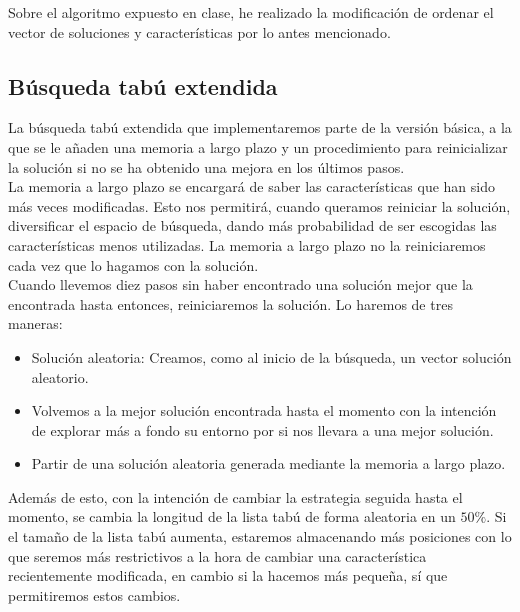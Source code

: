 \documentclass[11pt,leqno]{article}
\begin{document}
	Sobre el algoritmo expuesto en clase, he realizado la modificación de ordenar el vector de soluciones y características por lo antes mencionado.
	
\subsection{Búsqueda tabú extendida}

La búsqueda tabú extendida que implementaremos parte de la versión básica, a la que se le añaden una memoria a largo plazo y un procedimiento para reinicializar la solución si no se ha obtenido una mejora en los últimos pasos.\\
La memoria a largo plazo se encargará de saber las características que han sido más veces modificadas. Esto nos permitirá, cuando queramos reiniciar la solución, diversificar el espacio de búsqueda, dando más probabilidad de ser escogidas las características menos utilizadas. La memoria a largo plazo no la reiniciaremos cada vez que lo hagamos con la solución.\\
Cuando llevemos diez pasos sin haber encontrado una solución mejor que la encontrada hasta entonces, reiniciaremos la solución. Lo haremos de tres maneras:
\begin{itemize}
\item Solución aleatoria: Creamos, como al inicio de la búsqueda, un vector solución aleatorio.
\item Volvemos a la mejor solución encontrada hasta el momento con la intención de explorar más a fondo su entorno por si nos llevara a una mejor solución.
\item Partir de una solución aleatoria generada mediante la memoria a largo plazo.
\end{itemize} 

Además de esto, con la intención de cambiar la estrategia seguida hasta el momento, se cambia la longitud de la lista tabú de forma aleatoria en un $50\%$. Si el tamaño de la lista tabú aumenta, estaremos almacenando más posiciones con lo que seremos más restrictivos a la hora de cambiar una característica recientemente modificada, en cambio si la hacemos más pequeña, sí que permitiremos estos cambios.
\end{document}

